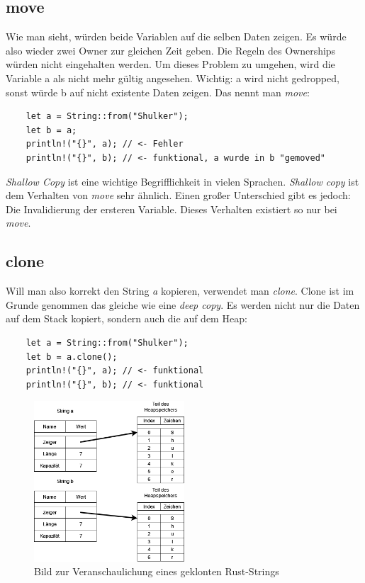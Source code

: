 \subsection{move}
Wie man sieht, würden beide Variablen auf die selben Daten zeigen. Es würde also wieder zwei Owner zur gleichen Zeit geben. Die Regeln des Ownerships würden
nicht eingehalten werden. Um dieses Problem zu umgehen, wird die Variable a als nicht mehr gültig angesehen. Wichtig: a wird nicht gedropped, sonst
würde b auf nicht existente Daten zeigen. Das nennt man \textit{move}:
\begin{lstlisting}
    let a = String::from("Shulker");
    let b = a;
    println!("{}", a); // <- Fehler
    println!("{}", b); // <- funktional, a wurde in b "gemoved"
\end{lstlisting}
\textit{Shallow Copy} ist eine wichtige Begrifflichkeit in vielen Sprachen. \textit{Shallow copy} ist dem Verhalten von \textit{move} sehr ähnlich. Einen
großer Unterschied gibt es jedoch: Die Invalidierung der ersteren Variable. Dieses Verhalten existiert so nur bei \textit{move}.

\subsection{clone}
Will man also korrekt den String \textit{a} kopieren, verwendet man \textit{clone}. Clone ist im Grunde genommen das gleiche wie eine \textit{deep copy}.
Es werden nicht nur die Daten auf dem Stack kopiert, sondern auch die auf dem Heap:
\begin{lstlisting}
    let a = String::from("Shulker");
    let b = a.clone();
    println!("{}", a); // <- funktional
    println!("{}", b); // <- funktional
\end{lstlisting}
\begin{figure}[H]
    \begin{center}
        \includegraphics[width=0.5\textwidth]{images/rust/string_clone_repr.png}
        \caption{Bild zur Veranschaulichung eines geklonten Rust-Strings}
    \end{center}
\end{figure}

